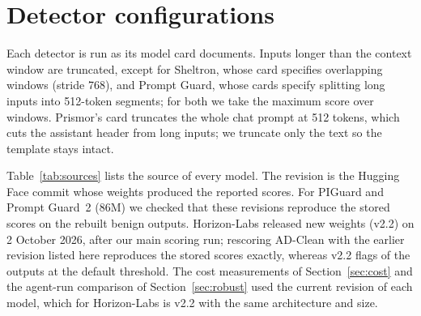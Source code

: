 \section{Detector configurations}
\label{app:configs}
Each detector is run as its model card documents. Inputs longer than the context window are truncated, except for Sheltron, whose card specifies overlapping windows (stride 768), and Prompt Guard, whose cards specify splitting long inputs into 512-token segments; for both we take the maximum score over windows. Prismor's card truncates the whole chat prompt at 512 tokens, which cuts the assistant header from long inputs; we truncate only the text so the template stays intact.

Table~\ref{tab:sources} lists the source of every model. The revision is the Hugging Face commit whose weights produced the reported scores. For PIGuard and Prompt Guard~2 (86M) we checked that these revisions reproduce the stored scores on the rebuilt benign outputs. Horizon-Labs released new weights (v2.2) on 2 October 2026, after our main scoring run; rescoring AD-Clean with the earlier revision listed here reproduces the stored scores exactly, whereas v2.2 flags \HZvTwoFlagged of the \NCleanOutputs outputs at the default threshold. The cost measurements of Section~\ref{sec:cost} and the agent-run comparison of Section~\ref{sec:robust} used the current revision of each model, which for Horizon-Labs is v2.2 with the same architecture and size.

